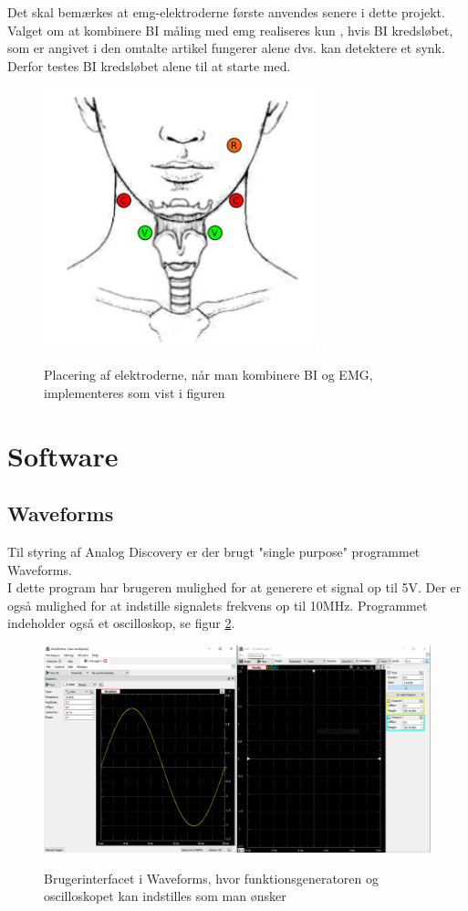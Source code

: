 Det skal bemærkes at emg-elektroderne første anvendes senere i dette projekt. Valget om at kombinere BI måling med emg realiseres kun , hvis BI kredsløbet, som er angivet i den omtalte artikel fungerer alene dvs. kan detektere et synk. Derfor testes BI kredsløbet alene til at starte med. 


\begin{figure}[H]
\centering
{\includegraphics[width=8cm]
{Figure/elektrodeplaceringREF}}
\caption{Placering af elektroderne, når man kombinere BI og EMG, implementeres som vist i figuren \cite{Nahrstaedt2012a}}
\label{fig:elektrodeplaceringREF}
\end{figure}







\section{Software}
\subsection{Waveforms}

Til styring af Analog Discovery er der brugt "single purpose"  programmet  Waveforms. \\ I dette program har brugeren mulighed for at generere et signal op til 5V. Der er også mulighed for at indstille signalets frekvens op til 10MHz. Programmet indeholder også et oscilloskop, se figur \ref{fig:waveforms}. 

\begin{figure}[H]
\centering
{\includegraphics[width=12cm]
{Figure/waveforms}}
\caption{Brugerinterfacet i Waveforms, hvor funktionsgeneratoren og oscilloskopet kan indstilles som man ønsker}
\label{fig:waveforms}
\end{figure}


